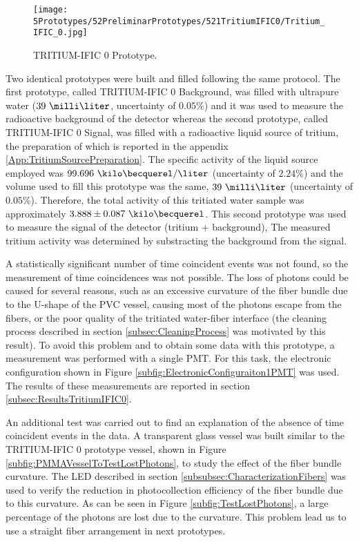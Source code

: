 \begin{figure}[h]
\centering
\texttt{[image: 5Prototypes/52PreliminarPrototypes/521TritiumIFIC0/Tritium\_IFIC\_0.jpg]}
\caption{TRITIUM-IFIC 0 Prototype.\label{fig:TritiumIFIC0}}
\end{figure}

Two identical prototypes were built and filled following the same protocol. The first prototype, called TRITIUM-IFIC 0 Background, was filled with  ultrapure water ($39~\milli\liter$, uncertainty of $0.05\%$) and it was used to measure the radioactive background of the detector whereas the second prototype, called TRITIUM-IFIC 0 Signal, was filled with a radioactive liquid source of tritium, the preparation of which is reported in the appendix \ref{App:TritiumSourcePreparation}. The specific activity of the liquid source employed was $99.696~\kilo\becquerel/\liter$ (uncertainty of $2.24\%$) and the volume used to fill this prototype was the same, $39~\milli\liter$ (uncertainty of $0.05\%$). Therefore, the total activity of this tritiated water sample was approximately $3.888 \pm 0.087~\kilo\becquerel$. This second prototype was used to measure the signal of the detector (tritium + background), The measured tritium activity was determined by substracting the background from the signal. 

A statistically significant number of time coincident events was not found, so the measurement of time coincidences was not possible. The loss of photons could be caused for several reasons, such as an excessive curvature of the fiber bundle due to the U-shape of the PVC vessel, causing most of the photons escape from the fibers, or the poor quality of the tritiated water-fiber interface (the cleaning process described in section \ref{subsec:CleaningProcess} was motivated by this result). To avoid this problem and to obtain some data with this prototype, a measurement was performed with a single PMT. For this task, the electronic configuration shown in Figure \ref{subfig:ElectronicConfiguraiton1PMT} was used. The results of these measurements are reported in section \ref{subsec:ResultsTritiumIFIC0}.

An additional test was carried out to find an explanation of the absence of time coincident events in the data. A transparent glass vessel was built similar to the TRITIUM-IFIC 0 prototype vessel, shown in Figure \ref{subfig:PMMAVesselToTestLostPhotons}, to study the effect of the fiber bundle curvature. The LED described in section \ref{subsubsec:CharacterizationFibers} was used to verify the reduction in photocollection efficiency of the fiber bundle due to this curvature. As can be seen in Figure \ref{subfig:TestLostPhotons}, a large percentage of the photons are lost due to the curvature. This problem lead us to use a straight fiber arrangement in next prototypes.

